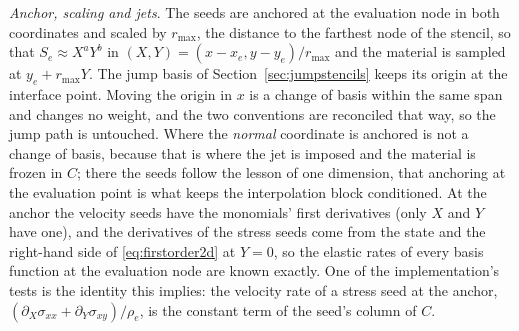 \documentclass[11pt]{amsart}
\theoremstyle{definition}
\theoremstyle{remark}
\newcommand{\para}[1]{\par\smallskip\noindent\textit{#1}.\enspace}
\begin{document}
\para{Anchor, scaling and jets}
The seeds are anchored at the evaluation node in both coordinates and
scaled by $r_{\max}$, the distance to the farthest node of the stencil,
so that $S_e \approx X^a Y^b$ in $(X, Y) = (x - x_e, y - y_e) / r_{\max}$
and the material is sampled at $y_e + r_{\max} Y$. The jump basis of
Section~\ref{sec:jumpstencils} keeps its origin at the interface point.
Moving the origin in $x$ is a change of basis within the same span and
changes no weight, and the two conventions are reconciled that way, so
the jump path is untouched. Where the \emph{normal} coordinate is
anchored is not a change of basis, because that is where the jet is
imposed and the material is frozen in $C$; there the seeds follow the
lesson of one dimension, that anchoring at the evaluation point is what
keeps the interpolation block conditioned. At the anchor the velocity
seeds have the monomials' first derivatives (only $X$ and $Y$ have one),
and the derivatives of the stress seeds come from the state and the
right-hand side of \eqref{eq:firstorder2d} at $Y = 0$, so the elastic
rates of every basis function at the evaluation node are known exactly.
One of the implementation's tests is the identity this implies: the
velocity rate of a stress seed at the anchor, $(\partial_X \sigma_{xx} +
\partial_Y \sigma_{xy}) / \rho_e$, is the constant term of the seed's
column of $C$.
\end{document}

